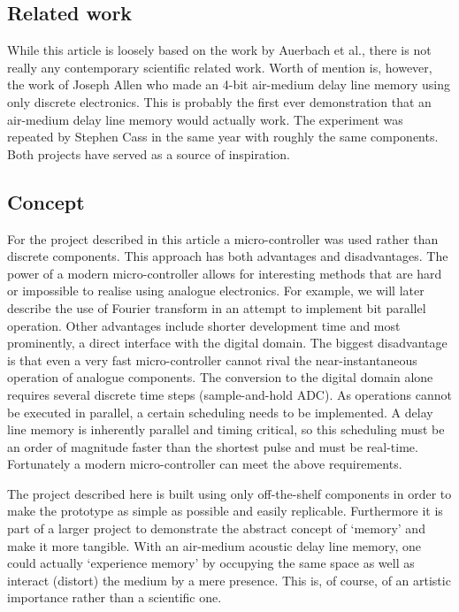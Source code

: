 \documentclass[10pt,a4paper,twocolumn]{article}
\begin{document}
\subsection{Related work}
While this article is loosely based on the work by Auerbach et al.\cite{auerbach}, there is not really any contemporary scientific related work. Worth of mention is, however, the work of Joseph Allen\cite{allen} who made an 4-bit air-medium delay line memory using only discrete electronics. This is probably the first ever demonstration that an air-medium delay line memory would actually work. The experiment was repeated by Stephen Cass\cite{cass} in the same year with roughly the same components. Both projects have served as a source of inspiration.

\subsection{Concept}
For the project described in this article a micro-controller was used rather than discrete components. This approach has both advantages and disadvantages. The power of a modern micro-controller allows for interesting methods that are hard or impossible to realise using analogue electronics. For example, we will later describe the use of Fourier transform in an attempt to implement bit parallel operation. Other advantages include shorter development time and most prominently, a direct interface with the digital domain. The biggest disadvantage is that even a very fast micro-controller cannot rival the near-instantaneous operation of analogue components. The conversion to the digital domain alone requires several discrete time steps (sample-and-hold ADC). As operations cannot be executed in parallel, a certain scheduling needs to be implemented. A delay line memory is inherently parallel and timing critical, so this scheduling must be an order of magnitude faster than the shortest pulse and must be real-time. Fortunately a modern micro-controller can meet the above requirements.

The project described here is built using only off-the-shelf components in order to make the prototype as simple as possible and easily replicable. Furthermore it is part of a larger project to demonstrate the abstract concept of `memory' and make it more tangible. With an air-medium acoustic delay line memory, one could actually `experience memory' by occupying the same space as well as interact (distort) the medium by a mere presence. This is, of course, of an artistic  importance rather than a scientific one.
\end{document}
